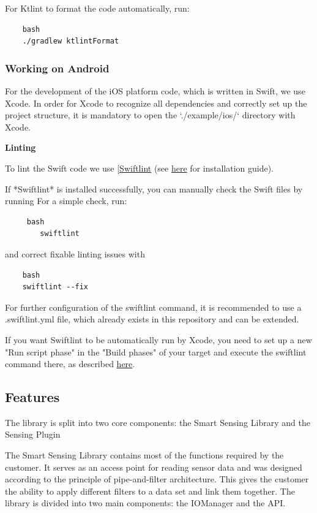 \documentclass[12pt]{article}
\begin{document}
    For Ktlint to format the code automatically, run:
    \begin{verbatim}
    bash
    ./gradlew ktlintFormat
    \end{verbatim}  
     \subsubsection{Working on Android}
    For the development of the iOS platform code, which is written in Swift, we use Xcode.
    In order for Xcode to recognize all dependencies and correctly set up the project structure, it is mandatory to open the `./example/ios/` directory with Xcode.
    
    \textbf{Linting}

   To lint the Swift code we use \href {https://github.com/realm/SwiftLin}{[Swiftlint} (see \href{https://github.com/realm/SwiftLint#installation}{here} for installation guide).
   
If *Swiftlint* is installed successfully, you can manually check the Swift files by running
    For a simple check, run:
    \begin{verbatim}
     bash
        swiftlint
    \end{verbatim}    
    
    and correct fixable linting issues with
    \begin{verbatim}
    bash
    swiftlint --fix
    \end{verbatim}  
    
For further configuration of the swiftlint command, it is recommended to use a .swiftlint.yml file, which already exists in this repository and can be extended.

If you want Swiftlint to be automatically run by Xcode, you need to set up a new "Run script phase" in the "Build phases" of your target and execute the swiftlint command there, as described \href{https://github.com/realm/SwiftLint#xcode}{here}.

\subsection{Features}
The library is split into two core components: the Smart Sensing Library and the Sensing Plugin

The Smart Sensing Library contains most of the functions required by the customer. It serves as an access point for reading sensor data and was designed according to the principle of pipe-and-filter architecture. This gives the customer the ability to apply different filters to a data set and link them together. The library is divided into two main components: the IOManager and the API.
\end{document}
